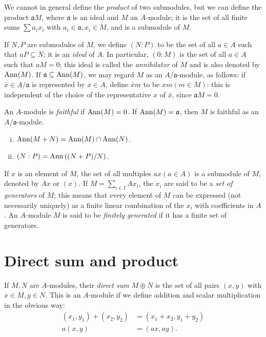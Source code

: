 \documentclass{standalone}
\theoremstyle{definition}
\theoremstyle{remark}
\begin{document}
We cannot in general define the \textit{product} of two submodules, but we can
define the product $\mathfrak{a} M$, where $\mathfrak{a}$ is an ideal and $M$ an
$A$-module; it is the set of all finite sums $\sum a_{i} x_{i}$ with
$a_{i} \in \mathfrak{a}, x_{i} \in M$, and is a submodule of $M$.

If $N, P$ are submodules of $M$, we define $(N: P)$ to be the set of all
$a \in A$ such that $a P \subseteq N$; it is an \textit{ideal} of $A$. In
particular, $(0: M)$ is the set of all $a \in A$ such that $a M=0$; this ideal
is called the \textit{annihilator} of $M$ and is also denoted by $\operatorname{Ann}(M)$. If
$\mathfrak{a} \subseteq \operatorname{Ann}(M)$, we may regard $M$ as an
$A / \mathfrak{a}$-module, as follows: if $\bar{x} \in A / \mathfrak{a}$ is
represented by $x \in A$, define $\bar{x} m$ to be $x m(m \in M)$: this is
independent of the choice of the representative $x$ of $\bar{x}$, since
$\mathfrak{a} M=0$.

An $A$-module is \textit{faithful} if $\operatorname{Ann}(M)=0$. If $\operatorname{Ann}(M)=\mathfrak{a}$,
then $M$ is faithful as an $A / \mathfrak{a}$-module.
\begin{exercise}\label{exc:2.2}
  \begin{enumerate}[i)]
    \item $\operatorname{Ann}(M+N)=\operatorname{Ann}(M) \cap \operatorname{Ann}(N)$.
    \item $(N: P)=\operatorname{Ann}\left((N+P) / N\right)$.
  \end{enumerate}
\end{exercise}

If $x$ is an element of $M$, the set of all multiples $a x(a \in A)$ is a
submodule of $M$, denoted by $A x$ or $(x)$. If $M=\sum_{i \in I} A x_{i}$, the
$x_{i}$ are said to be a \textit{set of generators} of $M$; this means that
every element of $M$ can be expressed (not necessarily uniquely) as a finite
linear combination of the $x_{i}$ with coefficients in $A$. An $A$-module $M$ is
said to be \textit{finitely generated} if it has a finite set of generators.

\section{Direct sum and product}
If $M, N$ are $A$-modules, their \textit{direct sum} $M \oplus N$ is the set of
all pairs $(x, y)$ with $x \in M, y \in N$. This is an $A$-module if we define
addition and scalar multiplication in the obvious way:
\begin{align*}
  (x_{1}, y_{1})+(x_{2}, y_{2}) & =(x_{1}+x_{2}, y_{1}+y_{2}) \\
  a(x, y) & =(a x, a y) .
\end{align*}
\end{document}
